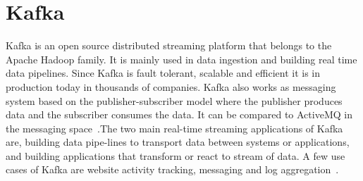 \section{Kafka}

Kafka is an open source distributed streaming platform that belongs 
to the Apache Hadoop family. It is mainly used in data ingestion and 
building real time data pipelines. Since Kafka is fault tolerant, 
scalable and efficient it is in production today in thousands of 
companies. Kafka also works as messaging system based on the 
publisher-subscriber model where the publisher produces data and 
the subscriber consumes the data. It can be compared to ActiveMQ 
in the messaging space~\cite{hid-sp18-517-ApacheKafka}.The two main
real-time streaming applications of Kafka are, building  data
pipe-lines to transport data between systems or applications, and
building applications that transform or react to stream of data. A few
use cases of Kafka are website activity tracking, messaging 
and log aggregation~\cite{hid-sp18-517-ApacheKafka}.

